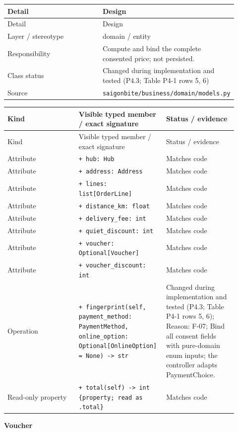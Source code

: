 \begin{longtable}{>{\raggedright\arraybackslash}p{0.4600\linewidth}>{\raggedright\arraybackslash}p{0.4600\linewidth}}
Detail & Design \\
\hline\endfirsthead
Detail & Design \\
\hline\endhead
Layer / stereotype & domain / \guillemotleft{}entity\guillemotright{} \\
Responsibility & Compute and bind the complete consented price; not persisted. \\
Class status & Changed during implementation and tested (P4.3; Table P4-1 rows 5, 6) \\
Source & \texttt{saigonbite/\allowbreak{}business/\allowbreak{}domain/\allowbreak{}models.\allowbreak{}py} \\
\end{longtable}
\begin{longtable}{>{\raggedright\arraybackslash}p{0.3067\linewidth}>{\raggedright\arraybackslash}p{0.3067\linewidth}>{\raggedright\arraybackslash}p{0.3067\linewidth}}
Kind & Visible typed member / exact signature & Status / evidence \\
\hline\endfirsthead
Kind & Visible typed member / exact signature & Status / evidence \\
\hline\endhead
Attribute & \texttt{+ hub: Hub} & Matches code \\
Attribute & \texttt{+ address: Address} & Matches code \\
Attribute & \texttt{+ lines: list[OrderLine]} & Matches code \\
Attribute & \texttt{+ distance\_\allowbreak{}km: float} & Matches code \\
Attribute & \texttt{+ delivery\_\allowbreak{}fee: int} & Matches code \\
Attribute & \texttt{+ quiet\_\allowbreak{}discount: int} & Matches code \\
Attribute & \texttt{+ voucher: Optional[Voucher]} & Matches code \\
Attribute & \texttt{+ voucher\_\allowbreak{}discount: int} & Matches code \\
Operation & \texttt{+ fingerprint(self, payment\_\allowbreak{}method: PaymentMethod, online\_\allowbreak{}option: Optional[OnlineOption] = None) -\textgreater{} str} & Changed during implementation and tested (P4.3; Table P4-1 rows 5, 6); Reason: F-07; Bind all consent fields with pure-domain enum inputs; the controller adapts PaymentChoice. \\
Read-only property & \texttt{+ total(self) -\textgreater{} int \{property; read as .\allowbreak{}total\}} & Matches code \\
\end{longtable}
\textbf{Voucher}

